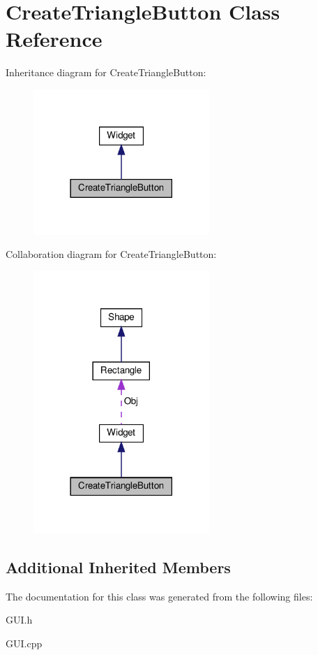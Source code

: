 \hypertarget{classCreateTriangleButton}{}\section{Create\+Triangle\+Button Class Reference}
\label{classCreateTriangleButton}


Inheritance diagram for Create\+Triangle\+Button\+:\nopagebreak
\begin{figure}[H]
\begin{center}
\leavevmode
\includegraphics[width=189pt]{classCreateTriangleButton__inherit__graph}
\end{center}
\end{figure}


Collaboration diagram for Create\+Triangle\+Button\+:\nopagebreak
\begin{figure}[H]
\begin{center}
\leavevmode
\includegraphics[width=189pt]{classCreateTriangleButton__coll__graph}
\end{center}
\end{figure}
\subsection*{Additional Inherited Members}


The documentation for this class was generated from the following files\+:\begin{DoxyCompactItemize}
\item 
G\+U\+I.\+h\item 
G\+U\+I.\+cpp\end{DoxyCompactItemize}
